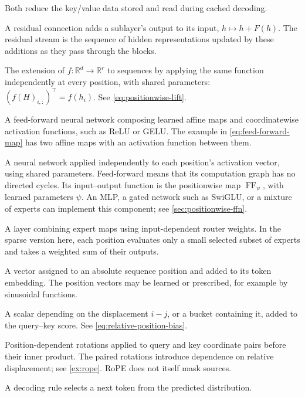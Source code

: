 \documentclass[11pt,twoside]{article}
\newcommand{\R}{\mathbb R}
\theoremstyle{plain}
\theoremstyle{definition}
\theoremstyle{remark}
\begin{document}
\begin{description}[style=nextline,leftmargin=1.5em,labelindent=0pt]
Both reduce the key/value data stored and read during cached decoding.
\item[Residual connection; residual stream]
A residual connection adds a sublayer's output to its input, $h\mapsto
h+F(h)$. The residual stream is the sequence of hidden representations
updated by these additions as they pass through the blocks.
\item[Positionwise map; positionwise lift]
The extension of $f:\R^d\to\R^r$ to sequences by applying the same
function independently at every position, with shared parameters:
$(f(H)_{i,:})^\top=f(h_i)$. See \cref{eq:positionwise-lift}.
\item[Multilayer perceptron (MLP)]
A feed-forward neural network composing learned affine maps and
coordinatewise activation functions, such as ReLU or GELU. The example in
\cref{eq:feed-forward-map} has two affine maps with an activation function
between them.
\item[Positionwise feed-forward network (FFN)]
A neural network applied independently to each position's activation vector,
using shared parameters. Feed-forward means that its computation graph has
no directed cycles. Its input--output function is the positionwise map
$\operatorname{FF}_\psi$, with learned parameters $\psi$. An MLP, a gated
network such as SwiGLU, or a mixture of experts can implement this component;
see \cref{sec:positionwise-ffn}.
\item[Mixture of experts (MoE)]
A layer combining expert maps using input-dependent router weights.
In the sparse version here, each position evaluates only a small selected
subset of experts and takes a weighted sum of their outputs.
\item[Absolute position embedding]
A vector assigned to an absolute sequence position and added to its token
embedding. The position vectors may be learned or prescribed, for example
by sinusoidal functions.
\item[Relative-position bias]
A scalar depending on the displacement $i-j$, or a bucket containing it,
added to the query--key score. See \cref{eq:relative-position-bias}.
\item[Rotary position embeddings (RoPE)]
Position-dependent rotations applied to query and key coordinate pairs
before their inner product. The paired rotations introduce dependence on
relative displacement; see \cref{ex:rope}. RoPE does not itself mask sources.
\item[Decoding rule; sampling; greedy decoding]
A decoding rule selects a next token from the predicted distribution.

\end{description}
\end{document}
